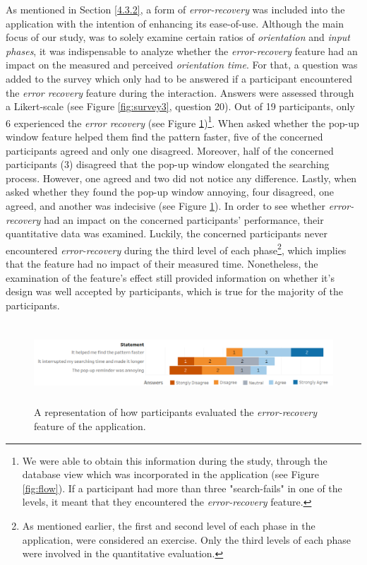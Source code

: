 As mentioned in Section \ref{4.3.2}, a form of \textit{error-recovery} was included into the application with the intention of enhancing its ease-of-use. Although the main focus of our study, was to solely examine certain ratios of \textit{orientation} and \textit{input phases}, it was indispensable to analyze whether the \textit{error-recovery} feature had an impact on the measured and perceived \textit{orientation time}. For that, a question was added to the survey which only had to be answered if a participant encountered the \textit{error recovery} feature during the interaction. Answers were assessed through a Likert-scale (see Figure \ref{fig:survey3}, question 20). Out of 19 participants, only 6 experienced the \textit{error recovery} (see Figure \ref{fig:error})\footnote{We were able to obtain this information during the study, through the database view which was incorporated in the application (see Figure \ref{fig:flow}). If a participant had more than three "search-fails" in one of the levels, it meant that they encountered the \textit{error-recovery} feature.}. When asked whether the pop-up window feature helped them find the pattern faster, five of the concerned participants agreed and only one disagreed. Moreover, half of the concerned participants (3) disagreed that the pop-up window elongated the searching process. However, one agreed and two did not notice any difference. Lastly, when asked whether they found the pop-up window annoying, four disagreed, one agreed, and another was indecisive (see Figure \ref{fig:error}). In order to see whether \textit{error-recovery} had an impact on the concerned participants' performance, their quantitative data was examined. Luckily, the concerned participants never encountered \textit{error-recovery} during the third level of each phase\footnote{As mentioned earlier, the first and second level of each phase in the application, were considered an exercise. Only the third levels of each phase were involved in the quantitative evaluation.}, which implies that the feature had no impact of their measured time. Nonetheless, the examination of the feature's effect still provided information on whether it's design was well accepted by participants, which is true for the majority of the participants. 

\begin{figure}[t!]
\centering
\includegraphics[width=15cm, height=3cm]{Chapters/graphics/ErrorRecovery.png}
\caption{A representation of how participants evaluated the \textit{error-recovery} feature of the application.}
\label{fig:error}
\end{figure}

